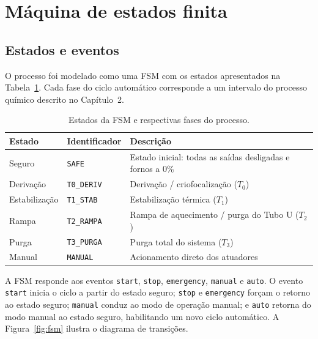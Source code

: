 \section{M\'aquina de estados finita}

\subsection{Estados e eventos}

O processo foi modelado como uma FSM com os estados apresentados na
Tabela~\ref{tab:estados}. Cada fase do ciclo autom\'atico corresponde a um
intervalo do processo qu\'imico descrito no Cap\'itulo~2.

\begin{table}[htbp]
\centering
\caption{Estados da FSM e respectivas fases do processo.}
\label{tab:estados}
\begin{tabular}{llp{8cm}}
\toprule
\textbf{Estado} & \textbf{Identificador} & \textbf{Descri\c{c}\~ao} \\
\midrule
Seguro & \texttt{SAFE} & Estado inicial: todas as sa\'idas desligadas e fornos a 0\% \\
Deriva\c{c}\~ao & \texttt{T0\_DERIV} & Deriva\c{c}\~ao / criofocaliza\c{c}\~ao ($T_0$) \\
Estabiliza\c{c}\~ao & \texttt{T1\_STAB} & Estabiliza\c{c}\~ao t\'ermica ($T_1$) \\
Rampa & \texttt{T2\_RAMPA} & Rampa de aquecimento / purga do Tubo U ($T_2$) \\
Purga & \texttt{T3\_PURGA} & Purga total do sistema ($T_3$) \\
Manual & \texttt{MANUAL} & Acionamento direto dos atuadores \\
\bottomrule
\end{tabular}
\par{}
\end{table}

A FSM responde aos eventos \texttt{start}, \texttt{stop}, \texttt{emergency},
\texttt{manual} e \texttt{auto}. O evento \texttt{start} inicia o ciclo a partir
do estado seguro; \texttt{stop} e \texttt{emergency} for\c{c}am o retorno ao
estado seguro; \texttt{manual} conduz ao modo de opera\c{c}\~ao manual; e
\texttt{auto} retorna do modo manual ao estado seguro, habilitando um novo ciclo
autom\'atico. A Figura~\ref{fig:fsm} ilustra o diagrama de transi\c{c}\~oes.

